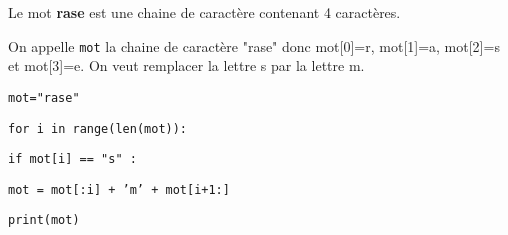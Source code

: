 \begin{minipage}{0.48\linewidth}
\begin{Ex}
Le mot \textbf{rase} est une chaine de caractère contenant 4 caractères. 

On appelle \texttt{mot} la chaine de caractère "rase" donc mot[0]=r, mot[1]=a, mot[2]=s et mot[3]=e. On veut remplacer la lettre s par la lettre m.
\end{Ex}
\end{minipage}
\hfill
\begin{minipage}{0.48\linewidth}
\begin{Cod}
\begin{description}[leftmargin=*]
\item \texttt{mot={\color{vert}"rase"}}
\item \texttt{{\color{orange}for} i {\color{orange}in}  {\color{violet}range}({\color{violet}len}(mot)):}
\item \hspace{0,5cm}\texttt{{\color{orange}if} mot[i] == "s" : }
\item \hspace{1cm}\texttt{mot = mot[:i] + {\color{vert}'m'} + mot[i+1:]}
\item \hspace{0,5cm}\texttt{{\color{violet}print}(mot)}
\end{description}
\end{Cod}
\end{minipage}










